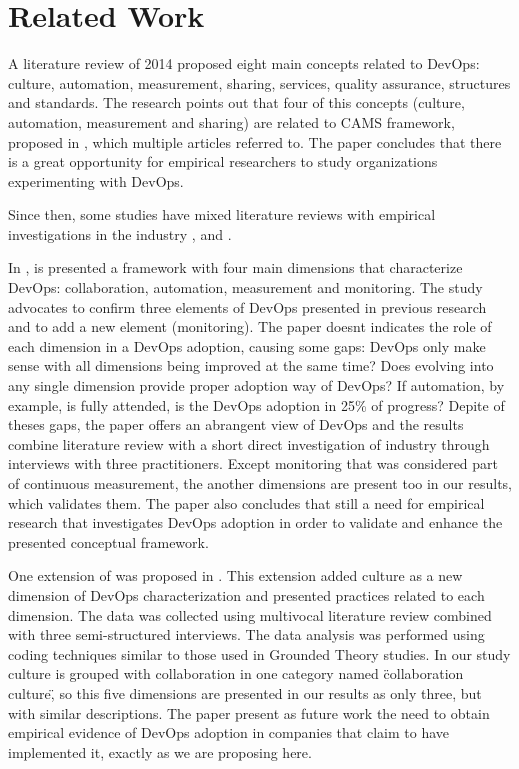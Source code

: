 \section{Related Work}

A literature review of 2014 \cite{cooperation_dev_ops_esem_2014} proposed eight
main concepts related to DevOps: culture, automation, measurement, sharing,
services, quality assurance, structures and standards.
The research points out that four of this concepts (culture, automation,
measurement and sharing) are related to CAMS framework, proposed in
\cite{what_devops_means_2010}, which multiple articles referred to.
The paper concludes that there is a great opportunity for empirical researchers
to study organizations experimenting with DevOps.

Since then, some studies have mixed literature reviews with empirical
investigations in the industry \cite{devops_a_definition_xp_15},
\cite{a_qualitative_study_journal_sw_17} and \cite{dimensions_of_devops_xp_15}.

In \cite{dimensions_of_devops_xp_15}, is presented a framework with four main
dimensions that characterize DevOps: collaboration, automation, measurement and
monitoring. The study advocates to confirm three elements of DevOps presented
in previous research and to add a new element (monitoring). The paper doesnt
indicates the role of each dimension in a DevOps adoption, causing some gaps:
DevOps only make sense with all dimensions being improved at the same time?
Does evolving into any single dimension provide proper adoption way of DevOps?
If automation, by example, is fully attended, is the DevOps adoption in 25\% of
progress? Depite of theses gaps, the paper offers an abrangent view of DevOps
and the results combine literature review with a short direct investigation of
industry through interviews with three practitioners. Except monitoring that
was considered part of continuous measurement, the another dimensions are
present too in our results, which validates them. The paper also concludes
that still a need for empirical research that investigates DevOps adoption in
order to validate and enhance the presented conceptual framework.

One extension of \cite{dimensions_of_devops_xp_15} was proposed in
\cite{extending_dimensions_icsea_16}. This extension added culture as a new
dimension of DevOps characterization and presented practices related to each
dimension. The data was collected using multivocal literature review combined
with three semi-structured interviews. The data analysis was performed using
coding techniques similar to those used in Grounded Theory studies. In our study
culture is grouped with collaboration in one category named \"collaboration
culture\", so this five dimensions are presented in our results as only three,
but with similar descriptions. The paper present as future work the need to
obtain empirical evidence of DevOps adoption in companies that claim to have
implemented it, exactly as we are proposing here.

